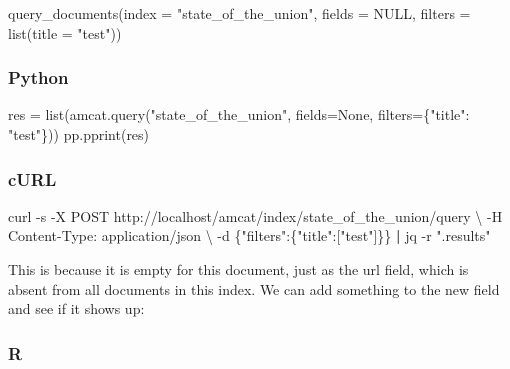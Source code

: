 \documentclass[
  letterpaper,
  DIV=11,
  numbers=noendperiod]{scrreprt}
\newenvironment{Shaded}{\begin{snugshade}}{\end{snugshade}}
\newcommand{\AttributeTok}[1]{\textcolor[rgb]{0.40,0.45,0.13}{#1}}
\newcommand{\BuiltInTok}[1]{\textcolor[rgb]{0.00,0.23,0.31}{#1}}
\newcommand{\ConstantTok}[1]{\textcolor[rgb]{0.56,0.35,0.01}{#1}}
\newcommand{\DataTypeTok}[1]{\textcolor[rgb]{0.68,0.00,0.00}{#1}}
\newcommand{\ExtensionTok}[1]{\textcolor[rgb]{0.00,0.23,0.31}{#1}}
\newcommand{\FunctionTok}[1]{\textcolor[rgb]{0.28,0.35,0.67}{#1}}
\newcommand{\KeywordTok}[1]{\textcolor[rgb]{0.00,0.23,0.31}{\textbf{#1}}}
\newcommand{\NormalTok}[1]{\textcolor[rgb]{0.00,0.23,0.31}{#1}}
\newcommand{\OperatorTok}[1]{\textcolor[rgb]{0.37,0.37,0.37}{#1}}
\newcommand{\StringTok}[1]{\textcolor[rgb]{0.13,0.47,0.30}{#1}}
\newcommand{\VariableTok}[1]{\textcolor[rgb]{0.07,0.07,0.07}{#1}}
\begin{document}
\begin{Shaded}
\begin{Highlighting}[]
\FunctionTok{query\_documents}\NormalTok{(}\AttributeTok{index =} \StringTok{"state\_of\_the\_union"}\NormalTok{, }\AttributeTok{fields =} \ConstantTok{NULL}\NormalTok{, }\AttributeTok{filters =} \FunctionTok{list}\NormalTok{(}\AttributeTok{title =} \StringTok{"test"}\NormalTok{))}
\end{Highlighting}
\end{Shaded}

\subsubsection{Python}

\begin{Shaded}
\begin{Highlighting}[]
\NormalTok{res }\OperatorTok{=} \BuiltInTok{list}\NormalTok{(amcat.query(}\StringTok{"state\_of\_the\_union"}\NormalTok{, fields}\OperatorTok{=}\VariableTok{None}\NormalTok{, filters}\OperatorTok{=}\NormalTok{\{}\StringTok{"title"}\NormalTok{: }\StringTok{"test"}\NormalTok{\}))}
\NormalTok{pp.pprint(res)}
\end{Highlighting}
\end{Shaded}

\subsubsection{cURL}

\begin{Shaded}
\begin{Highlighting}[]
\ExtensionTok{curl} \AttributeTok{{-}s} \AttributeTok{{-}X}\NormalTok{ POST http://localhost/amcat/index/state\_of\_the\_union/query }\DataTypeTok{\textbackslash{}}
  \AttributeTok{{-}H} \StringTok{\textquotesingle{}Content{-}Type: application/json\textquotesingle{}} \DataTypeTok{\textbackslash{}}
  \AttributeTok{{-}d} \StringTok{\textquotesingle{}\{"filters":\{"title":["test"]\}\}\textquotesingle{}} \KeywordTok{|} \ExtensionTok{jq} \AttributeTok{{-}r} \StringTok{".results"}
\end{Highlighting}
\end{Shaded}

This is because it is empty for this document, just as the url field,
which is absent from all documents in this index. We can add something
to the new field and see if it shows up:

\subsubsection{R}
\end{document}
